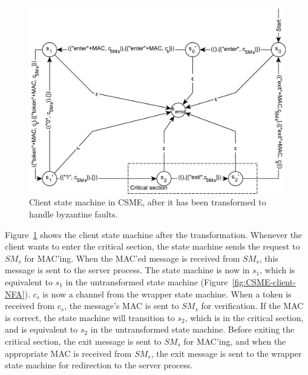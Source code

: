 \documentclass{article}
\begin{document}
		\FloatBarrier
		\begin{figure}[ht!]
			\center
			\includegraphics[width=\textwidth]{figures/state-machines/CSME-client-NFA-transformed.pdf}
			\caption{Client state machine in CSME, after it has been transformed to handle byzantine faults.}
			\label{fig:CSME-client-NFA-transformed}
		\end{figure}
		\FloatBarrier

		Figure~\ref{fig:CSME-client-NFA-transformed} shows the client state machine after the transformation.
		Whenever the client wants to enter the critical section, the state machine sends the request to $SM_s$ for MAC'ing.
		When the MAC'ed message is received from $SM_s$, this message is sent to the server process.
		The state machine is now in $s_1$, which is equivalent to $s_1$ in the untransformed state machine (Figure~\ref{fig:CSME-client-NFA}).
		$c_s$ is now a channel from the wrapper state machine.
		When a token is received from $c_s$, the message's MAC is sent to $SM_s$ for verification.
		If the MAC is correct, the state machine will transition to $s_2$, which is in the critical section, and is equivalent to $s_2$ in the untransformed state machine.
		Before exiting the critical section, the exit message is sent to $SM_s$ for MAC'ing, and when the appropriate MAC is received from $SM_s$, the exit message is sent to the wrapper state machine for redirection to the server process.
\end{document}
